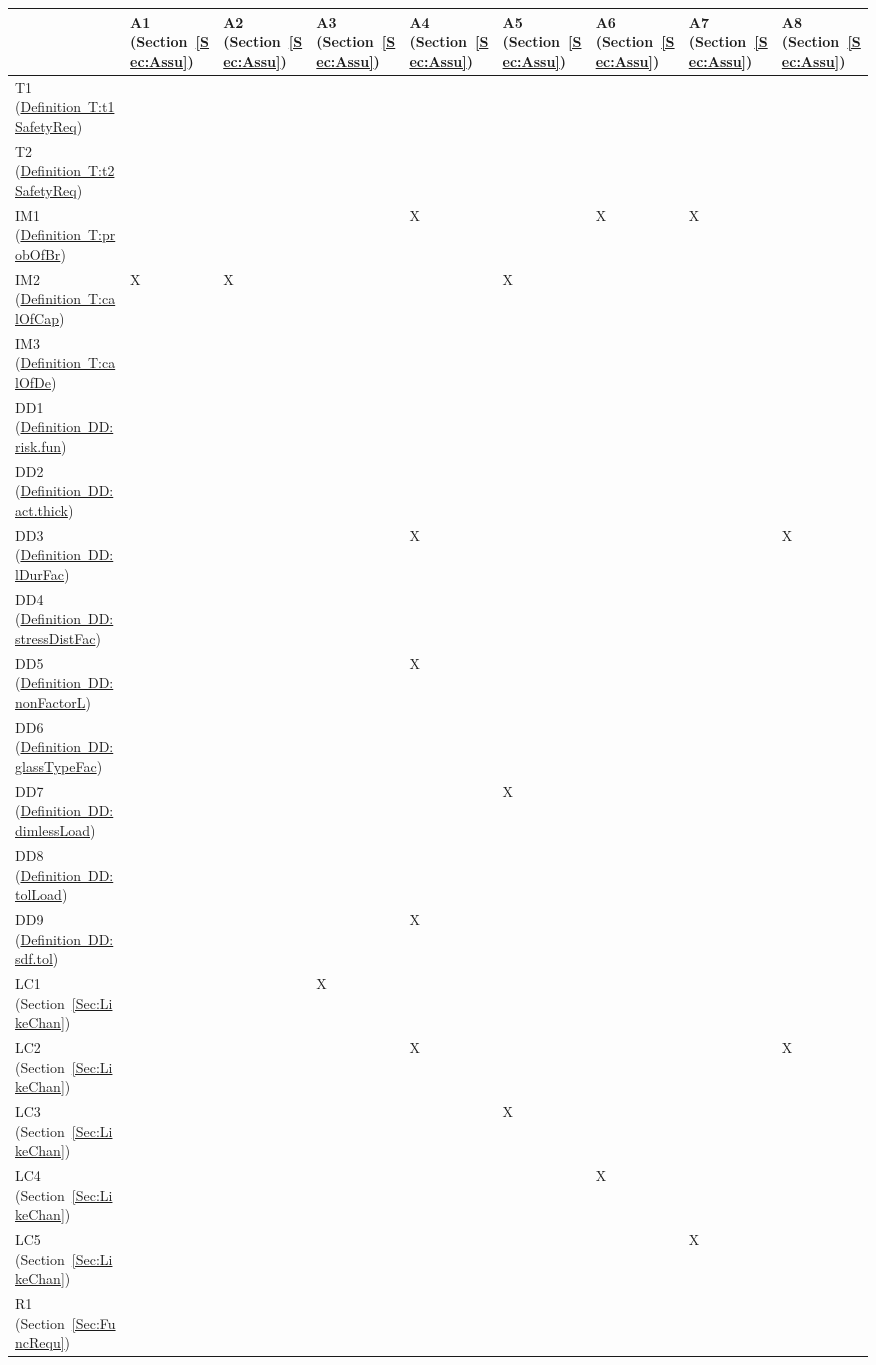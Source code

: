 \documentclass[12pt]{article}
\begin{document}
\begin{longtable}{l l l l l l l l l}
\toprule
 & A1 (Section~\ref{Sec:Assu}) & A2 (Section~\ref{Sec:Assu}) & A3 (Section~\ref{Sec:Assu}) & A4 (Section~\ref{Sec:Assu}) & A5 (Section~\ref{Sec:Assu}) & A6 (Section~\ref{Sec:Assu}) & A7 (Section~\ref{Sec:Assu}) & A8 (Section~\ref{Sec:Assu})
\\
\midrule
T1 (\hyperref[T:t1SafetyReq]{Definition~T:t1SafetyReq}) &  &  &  &  &  &  &  & 
\\
T2 (\hyperref[T:t2SafetyReq]{Definition~T:t2SafetyReq}) &  &  &  &  &  &  &  & 
\\
IM1 (\hyperref[T:probOfBr]{Definition~T:probOfBr}) &  &  &  & X &  & X & X & 
\\
IM2 (\hyperref[T:calOfCap]{Definition~T:calOfCap}) & X & X &  &  & X &  &  & 
\\
IM3 (\hyperref[T:calOfDe]{Definition~T:calOfDe}) &  &  &  &  &  &  &  & 
\\
DD1 (\hyperref[DD:risk.fun]{Definition~DD:risk.fun}) &  &  &  &  &  &  &  & 
\\
DD2 (\hyperref[DD:act.thick]{Definition~DD:act.thick}) &  &  &  &  &  &  &  & 
\\
DD3 (\hyperref[DD:lDurFac]{Definition~DD:lDurFac}) &  &  &  & X &  &  &  & X
\\
DD4 (\hyperref[DD:stressDistFac]{Definition~DD:stressDistFac}) &  &  &  &  &  &  &  & 
\\
DD5 (\hyperref[DD:nonFactorL]{Definition~DD:nonFactorL}) &  &  &  & X &  &  &  & 
\\
DD6 (\hyperref[DD:glassTypeFac]{Definition~DD:glassTypeFac}) &  &  &  &  &  &  &  & 
\\
DD7 (\hyperref[DD:dimlessLoad]{Definition~DD:dimlessLoad}) &  &  &  &  & X &  &  & 
\\
DD8 (\hyperref[DD:tolLoad]{Definition~DD:tolLoad}) &  &  &  &  &  &  &  & 
\\
DD9 (\hyperref[DD:sdf.tol]{Definition~DD:sdf.tol}) &  &  &  & X &  &  &  & 
\\
LC1 (Section~\ref{Sec:LikeChan}) &  &  & X &  &  &  &  & 
\\
LC2 (Section~\ref{Sec:LikeChan}) &  &  &  & X &  &  &  & X
\\
LC3 (Section~\ref{Sec:LikeChan}) &  &  &  &  & X &  &  & 
\\
LC4 (Section~\ref{Sec:LikeChan}) &  &  &  &  &  & X &  & 
\\
LC5 (Section~\ref{Sec:LikeChan}) &  &  &  &  &  &  & X & 
\\
R1 (Section~\ref{Sec:FuncRequ}) &  &  &  &  &  &  &  & 

\end{longtable}
\end{document}
